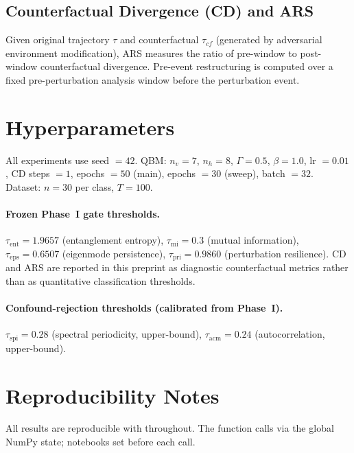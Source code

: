 \documentclass[11pt]{article}
\begin{document}
	\subsection{Counterfactual Divergence (CD) and ARS}
	
	Given original trajectory $\tau$ and counterfactual $\tau_{cf}$ (generated by
	adversarial environment modification), ARS measures the ratio of pre-window to
	post-window counterfactual divergence. Pre-event restructuring is computed over
	a fixed pre-perturbation analysis window before the perturbation event.
	
	\section{Hyperparameters}\label{app:hyperparams}
	
	All experiments use seed $= 42$. QBM: $n_v = 7$, $n_h = 8$, $\Gamma = 0.5$,
	$\beta = 1.0$, lr $= 0.01$, CD steps $= 1$, epochs $= 50$ (main),
	epochs $= 30$ (sweep), batch $= 32$. Dataset: $n = 30$ per class, $T = 100$.
	
	\paragraph{Frozen Phase~I gate thresholds.}
	$\tau_\mathrm{ent} = 1.9657$ (entanglement entropy),
	$\tau_\mathrm{mi} = 0.3$ (mutual information),
	$\tau_\mathrm{eps} = 0.6507$ (eigenmode persistence),
	$\tau_\mathrm{pri} = 0.9860$ (perturbation resilience).
	CD and ARS are reported in this preprint as diagnostic counterfactual metrics
	rather than as quantitative classification thresholds.
	
	\paragraph{Confound-rejection thresholds (calibrated from Phase~I).}
	$\tau_\mathrm{spi} = 0.28$ (spectral periodicity, upper-bound),
	$\tau_\mathrm{acm} = 0.24$ (autocorrelation, upper-bound).
	
	\section{Reproducibility Notes}\label{app:repro}
	
	All results are reproducible with  throughout. The
	 function calls  via the global
	NumPy state; notebooks set  before each
	 call.
	
\end{document}
